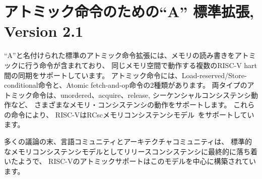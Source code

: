 \begin{comment}
\chapter{``A'' Standard Extension for Atomic Instructions, Version 2.1}
\end{comment}
\chapter{アトミック命令のための``A'' 標準拡張, Version 2.1}
\label{atomics}

\begin{comment}
The standard atomic-instruction extension, named ``A'',
contains instructions that atomically
read-modify-write memory to support synchronization between multiple
RISC-V harts running in the same memory space.  The two forms of
atomic instruction provided are load-reserved/store-conditional
instructions and atomic fetch-and-op memory instructions.  Both types
of atomic instruction support various memory consistency orderings
including unordered, acquire, release, and sequentially consistent
semantics.  These instructions allow RISC-V to support the RCsc memory
consistency model~\cite{Gharachorloo90memoryconsistency}.
\end{comment}

``A''と名付けられた標準のアトミック命令拡張には、メモリの読み書きをアトミックに行う命令が含まれており、
同じメモリ空間で動作する複数のRISC-V hart間の同期をサポートしています。
アトミック命令には、Load-reserved/Store-conditional命令と、Atomic fetch-and-op命令の2種類があります。
両タイプのアトミック命令は、unordered、acquire、release, シーケンシャルコンシステンシ動作など、
さまざまなメモリ・コンシステンシの動作をサポートします。 これらの命令により、
RISC-VはRCscメモリコンシステンシモデル~\cite{Gharachorloo90memoryconsistency}をサポートしています。

\begin{commentary}
\begin{comment}
After much debate, the language community and architecture community
appear to have finally settled on release consistency as the standard
memory consistency model and so the RISC-V atomic support is built
around this model.
\end{comment}
多くの議論の末、言語コミュニティとアーキテクチャコミュニティは、
標準的なメモリコンシステンシモデルとしてリリースコンシステンシに最終的に落ち着いたようで、
RISC-Vのアトミックサポートはこのモデルを中心に構築されています。
\end{commentary}

